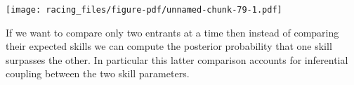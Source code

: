 \documentclass[
  letterpaper,
  DIV=11,
  numbers=noendperiod]{scrartcl}
\newenvironment{Shaded}{\begin{snugshade}}{\end{snugshade}}
\newcommand{\AttributeTok}[1]{\textcolor[rgb]{0.40,0.45,0.13}{#1}}
\newcommand{\ConstantTok}[1]{\textcolor[rgb]{0.56,0.35,0.01}{#1}}
\newcommand{\DecValTok}[1]{\textcolor[rgb]{0.68,0.00,0.00}{#1}}
\newcommand{\FloatTok}[1]{\textcolor[rgb]{0.68,0.00,0.00}{#1}}
\newcommand{\FunctionTok}[1]{\textcolor[rgb]{0.28,0.35,0.67}{#1}}
\newcommand{\NormalTok}[1]{\textcolor[rgb]{0.00,0.23,0.31}{#1}}
\newcommand{\OtherTok}[1]{\textcolor[rgb]{0.00,0.23,0.31}{#1}}
\newcommand{\SpecialCharTok}[1]{\textcolor[rgb]{0.37,0.37,0.37}{#1}}
\newcommand{\StringTok}[1]{\textcolor[rgb]{0.13,0.47,0.30}{#1}}
\begin{document}
\begin{Shaded}
\end{Shaded}

\texttt{[image: racing\_files/figure-pdf/unnamed-chunk-79-1.pdf]}

If we want to compare only two entrants at a time then instead of
comparing their expected skills we can compute the posterior probability
that one skill surpasses the other. In particular this latter comparison
accounts for inferential coupling between the two skill parameters.
\end{document}

